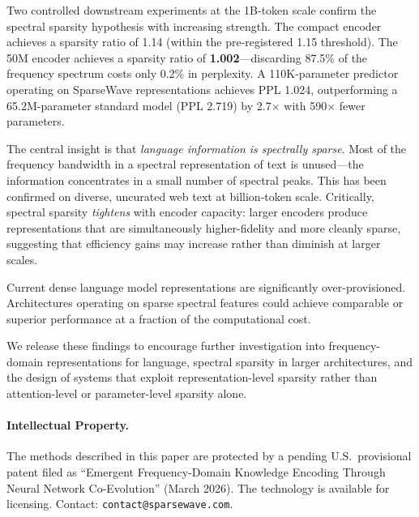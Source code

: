 \documentclass[10pt,twocolumn]{article}
\begin{document}
Two controlled downstream experiments at the 1B-token scale confirm the spectral sparsity hypothesis with increasing strength. The compact encoder achieves a sparsity ratio of 1.14 (within the pre-registered 1.15 threshold). The 50M encoder achieves a sparsity ratio of \textbf{1.002}---discarding 87.5\% of the frequency spectrum costs only 0.2\% in perplexity. A 110K-parameter predictor operating on SparseWave representations achieves PPL 1.024, outperforming a 65.2M-parameter standard model (PPL 2.719) by 2.7$\times$ with 590$\times$ fewer parameters.

The central insight is that \emph{language information is spectrally sparse}. Most of the frequency bandwidth in a spectral representation of text is unused---the information concentrates in a small number of spectral peaks. This has been confirmed on diverse, uncurated web text at billion-token scale. Critically, spectral sparsity \emph{tightens} with encoder capacity: larger encoders produce representations that are simultaneously higher-fidelity and more cleanly sparse, suggesting that efficiency gains may increase rather than diminish at larger scales.

Current dense language model representations are significantly over-provisioned. Architectures operating on sparse spectral features could achieve comparable or superior performance at a fraction of the computational cost.

We release these findings to encourage further investigation into frequency-domain representations for language, spectral sparsity in larger architectures, and the design of systems that exploit representation-level sparsity rather than attention-level or parameter-level sparsity alone.

\paragraph{Intellectual Property.} The methods described in this paper are protected by a pending U.S.\ provisional patent filed as ``Emergent Frequency-Domain Knowledge Encoding Through Neural Network Co-Evolution'' (March 2026). The technology is available for licensing. Contact: \texttt{contact@sparsewave.com}.
\end{document}

